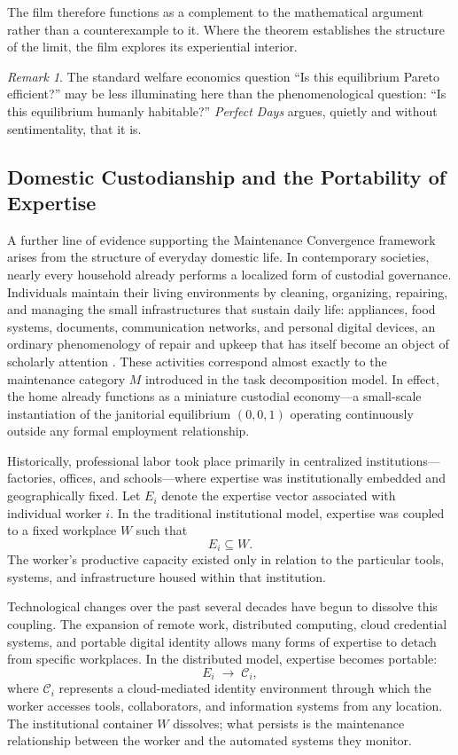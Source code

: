 \documentclass[12pt,a4paper]{article}
\theoremstyle{plain}
\theoremstyle{definition}
\theoremstyle{remark}
\newtheorem{remark}[theorem]{Remark}
\begin{document}
The film therefore functions as a complement to the mathematical argument
rather than a counterexample to it.  Where the theorem establishes the
structure of the limit, the film explores its experiential interior.

\begin{remark}
The standard welfare economics question ``Is this equilibrium Pareto
efficient?'' may be less illuminating here than the phenomenological question:
``Is this equilibrium humanly habitable?''  \emph{Perfect Days} argues, quietly
and without sentimentality, that it is.
\end{remark}


\subsection{Domestic Custodianship and the Portability of Expertise}
\label{sec:domestic}

A further line of evidence supporting the Maintenance Convergence framework
arises from the structure of everyday domestic life.  In contemporary
societies, nearly every household already performs a localized form of
custodial governance.  Individuals maintain their living environments by
cleaning, organizing, repairing, and managing the small infrastructures
that sustain daily life: appliances, food systems, documents, communication
networks, and personal digital devices, an ordinary phenomenology of repair
and upkeep that has itself become an object of scholarly attention
\cite{graham2007}.  These activities correspond almost
exactly to the maintenance category $M$ introduced in the task decomposition
model.  In effect, the home already functions as a miniature custodial
economy---a small-scale instantiation of the janitorial equilibrium $(0,0,1)$
operating continuously outside any formal employment relationship.

Historically, professional labor took place primarily in centralized
institutions---factories, offices, and schools---where expertise was
institutionally embedded and geographically fixed.  Let $E_i$ denote the
expertise vector associated with individual worker $i$.  In the traditional
institutional model, expertise was coupled to a fixed workplace $W$ such that
\[
E_i \subseteq W.
\]
The worker's productive capacity existed only in relation to the particular
tools, systems, and infrastructure housed within that institution.

Technological changes over the past several decades have begun to dissolve
this coupling.  The expansion of remote work, distributed computing, cloud
credential systems, and portable digital identity allows many forms of
expertise to detach from specific workplaces.  In the distributed model,
expertise becomes portable:
\[
E_i \;\longrightarrow\; \mathcal{C}_i,
\]
where $\mathcal{C}_i$ represents a cloud-mediated identity environment
through which the worker accesses tools, collaborators, and information
systems from any location.  The institutional container $W$ dissolves;
what persists is the maintenance relationship between the worker and the
automated systems they monitor.
\end{document}
